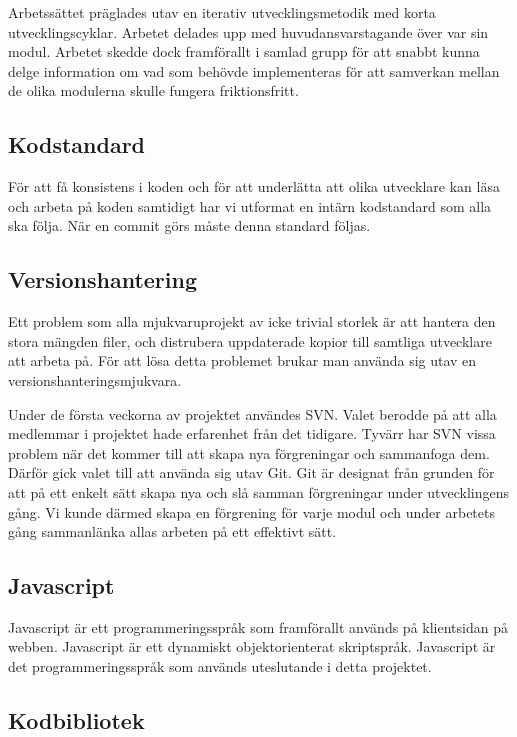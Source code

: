 Arbetssättet präglades utav en iterativ utvecklingsmetodik med korta utvecklingscyklar. Arbetet delades upp med huvudansvarstagande över var sin modul. Arbetet skedde dock framförallt i samlad grupp för att snabbt kunna delge information om vad som behövde implementeras för att samverkan mellan de olika modulerna skulle fungera friktionsfritt.

\subsection{Kodstandard} 
För att få konsistens i koden och för att underlätta att olika utvecklare kan läsa och arbeta på koden samtidigt har vi utformat en intärn kodstandard som alla ska följa.
När en commit görs måste denna standard följas.

\subsection{Versionshantering} 
Ett problem som alla mjukvaruprojekt av icke trivial storlek är att hantera den stora mängden filer, och distrubera uppdaterade kopior till samtliga utvecklare att arbeta på.
För att lösa detta problemet brukar man använda sig utav en versionshanteringsmjukvara. 

Under de första veckorna av projektet användes SVN. Valet berodde på att  alla medlemmar i projektet hade erfarenhet från det tidigare. Tyvärr har SVN vissa problem när det kommer till att skapa nya förgreningar och sammanfoga dem. Därför gick valet till att använda sig utav Git. Git är designat från grunden för att på ett enkelt sätt skapa nya och slå samman förgreningar under utvecklingens gång. Vi kunde därmed skapa en förgrening för varje modul och under arbetets gång sammanlänka allas arbeten på ett effektivt sätt. 

\subsection{Javascript} 
Javascript \citep{javascript} är ett programmeringsspråk som framförallt används på klientsidan på webben. Javascript är ett dynamiskt objektorienterat skriptspråk.
Javascript är det programmeringsspråk som används uteslutande i detta projektet.

\subsection{Kodbibliotek}

